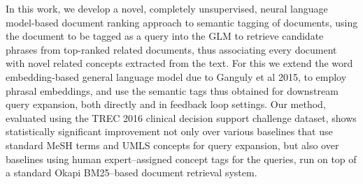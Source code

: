 In this work, we develop a novel, completely unsupervised, neural language model-based document ranking approach to semantic tagging of documents, using the document to be tagged as a query into the GLM to retrieve candidate phrases from top-ranked related documents, thus associating every document with novel related concepts extracted from the text. For this we extend the word embedding-based general language model due to Ganguly et al 2015, to employ phrasal embeddings, and use the semantic tags thus obtained for downstream query expansion, both directly and in feedback loop settings. Our method, evaluated using the TREC 2016 clinical decision support challenge dataset, shows statistically significant improvement not only over various baselines that use standard MeSH terms and UMLS concepts for query expansion, but also over baselines using human expert--assigned concept tags for the queries, run on top of a standard Okapi BM25--based document retrieval system.
